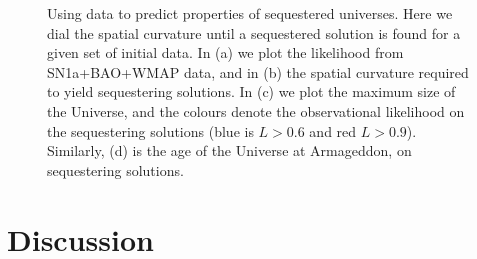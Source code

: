 \documentclass[amsmath,amssymb,10pt,twocolumn,eqsecnum]{revtex4}
\begin{document}
\begin{figure}[!t]
\begin{center}
      \end{center}
\caption{Using data to predict properties of sequestered universes. Here we dial the spatial curvature until a sequestered solution is found for a given set of initial data. In (a) we plot the likelihood from SN1a+BAO+WMAP data, and in (b) the spatial curvature required to yield sequestering solutions. In (c) we plot the maximum size of the Universe, and the colours denote the observational likelihood on the sequestering solutions (blue is $L > 0.6$ and red $L > 0.9$). Similarly, (d) is the age of the Universe at Armageddon, on sequestering solutions. }\label{likelihood_sequestering_sweep}
\end{figure}

\section{Discussion} 



\end{document}
